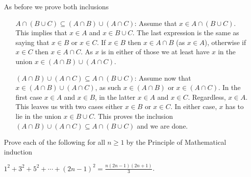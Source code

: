 \documentclass[a4paper, english, 12pt]{article} %
\newcommand{\solutions}{true} %
\begin{document}
\begin{answer}
  As before we prove both inclusions
  \begin{enumerate}[align=left]
    \item[$A \cap (B \cup C) \subseteq (A \cap B) \cup (A \cap C)$:] Assume that
      $x \in A \cap (B \cup C)$. This implies that $x \in A$ and $x \in B \cup
      C$. The last expression is the same as saying that $x \in B$ or $x \in C$.
      If $x \in B$ then $x \in A \cap B$ (as $x \in A$), otherwise if $x \in C$ then $x \in A
      \cap C$. As $x$ is in either of those we at least have $x$ in the union $x
      \in (A \cap B) \cup (A \cap C)$.
    \item[$(A \cap B) \cup (A \cap C) \subseteq A \cap (B \cup C)$:]
      Assume now that $x \in (A \cap B) \cup (A \cap C)$, as such $x \in (A \cap
      B)$ or $x \in (A \cap C)$. In the first case $x \in A$ and $x \in B$, in
      the latter $x \in A$ and $x \in C$. Regardless, $x \in A$. This leaves us
      with two cases either $x \in B$ or $x \in C$. In either case, $x$ has to
      lie in the union $x \in B \cup C$. This proves the inclusion
      $(A \cap B) \cup (A \cap C) \subseteq A \cap (B \cup C)$ and we are
      done.  
  \end{enumerate} 
\end{answer}


\ifthenelse{\boolean{\solutions}}{\newpage}{}


\begin{problem}
  Prove each of the following for all $n \geq 1$ by the Principle of
  Mathematical induction
\end{problem}

\begin{subproblem}
  $\displaystyle 1^2 + 3^2 + 5^2 + \cdots + (2n-1)^2 = \frac{n(2n-1)(2n+1)}{3}$.
\end{subproblem}
\end{document}
